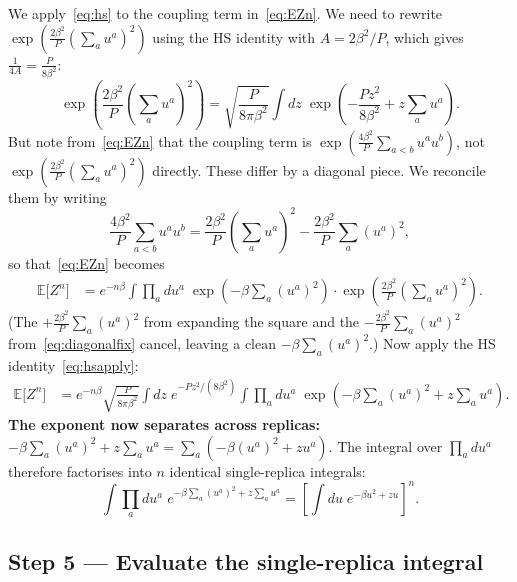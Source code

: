 \documentclass[nobib,justified]{tufte-handout}
\newcommand{\EE}{\mathbb{E}}
\begin{document}
\noindent We apply~\eqref{eq:hs} to the coupling term in~\eqref{eq:EZn}.
We need to rewrite $\exp\!\left(\frac{2\beta^2}{P}(\sum_a
u^a)^2\right)$ using the HS identity with $A=2\beta^2/P$, which gives
$\frac{1}{4A}=\frac{P}{8\beta^2}$:
\begin{equation}
  \exp\!\left(\frac{2\beta^2}{P}\left(\sum_a u^a\right)^2\right)
  = \sqrt{\frac{P}{8\pi\beta^2}}
    \int dz\;
    \exp\!\left(-\frac{Pz^2}{8\beta^2} + z\sum_a u^a\right).
  \label{eq:hsapply}
\end{equation}
But note from~\eqref{eq:EZn} that the coupling term is
$\exp(\frac{4\beta^2}{P}\sum_{a<b}u^au^b)$, not
$\exp(\frac{2\beta^2}{P}(\sum_a u^a)^2)$ directly.  These differ by a
diagonal piece.  We reconcile them by writing
\begin{equation}
  \frac{4\beta^2}{P}\sum_{a<b}u^au^b
  = \frac{2\beta^2}{P}\left(\sum_a u^a\right)^2
    - \frac{2\beta^2}{P}\sum_a(u^a)^2,
  \label{eq:diagonalfix}
\end{equation}
so that~\eqref{eq:EZn} becomes
\begin{align}
  \EE\bigl[Z^n\bigr]
  &= e^{-n\beta}
    \int\prod_a du^a\;
    \exp\!\left(-\beta\sum_a(u^a)^2\right)
    \cdot
    \exp\!\left(\frac{2\beta^2}{P}\left(\sum_a u^a\right)^2\right).
  \label{eq:EZnbefore}
\end{align}
(The $+\frac{2\beta^2}{P}\sum_a(u^a)^2$ from expanding the square and
the $-\frac{2\beta^2}{P}\sum_a(u^a)^2$ from~\eqref{eq:diagonalfix}
cancel, leaving a clean $-\beta\sum_a(u^a)^2$.)  Now apply the HS
identity~\eqref{eq:hsapply}:
\begin{align}
  \EE\bigl[Z^n\bigr]
  &= e^{-n\beta}\sqrt{\frac{P}{8\pi\beta^2}}
    \int dz\;e^{-Pz^2/(8\beta^2)}
    \int\prod_a du^a\;
    \exp\!\left(-\beta\sum_a(u^a)^2 + z\sum_a u^a\right).
  \label{eq:EZndecoupled}
\end{align}
\textbf{The exponent now separates across replicas:}
$-\beta\sum_a(u^a)^2 + z\sum_a u^a = \sum_a(-\beta(u^a)^2 + zu^a)$.
The integral over $\prod_a du^a$ therefore factorises into $n$ identical
single-replica integrals:
\begin{equation}
  \int\prod_a du^a\;
  e^{-\beta\sum_a(u^a)^2 + z\sum_a u^a}
  = \left[\int du\;e^{-\beta u^2 + zu}\right]^n.
  \label{eq:factorise}
\end{equation}

\subsection*{Step 5 --- Evaluate the single-replica integral}
\end{document}
